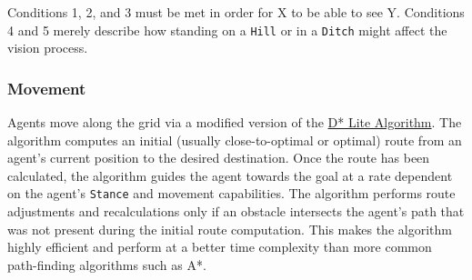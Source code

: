\documentclass[
  a4paper,
  english,
  DIV=16,
  11pt,
  parskip=half,
  dvipsnames,
  listof=totoc,		     %
  index=totoc,		     %
  bibliography=totoc,	 %
]{scrartcl}
\begin{document}
%
Conditions 1, 2, and 3 must be met in order for X to be able to see Y. Conditions 4 and 5 merely describe how standing on a \texttt{Hill} or in a \texttt{Ditch} might affect the vision process.
%
\subsubsection{Movement} \label{sssec:movement}
Agents move along the grid via a modified version of the \href{http://idm-lab.org/bib/abstracts/papers/aaai02b.pdf}{D* Lite Algorithm}. The algorithm computes an initial (usually close-to-optimal or optimal) route from an agent's current position to the desired destination. Once the route has been calculated, the algorithm guides the agent towards the goal at a rate dependent on the agent's \texttt{Stance} and movement capabilities. The algorithm performs route adjustments and recalculations only if an obstacle intersects the agent's path that was not present during the initial route computation. This makes the algorithm highly efficient and perform at a better time complexity than more common path-finding algorithms such as A*.
%
\end{document}
